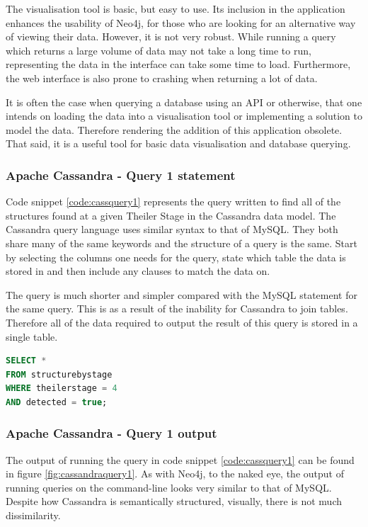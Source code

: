 The visualisation tool is basic, but easy to use. Its inclusion in the application enhances the usability of Neo4j, for those who are looking for an alternative way of viewing their data. However, it is not very robust. While running a query which returns a large volume of data may not take a long time to run, representing the data in the interface can take some time to load. Furthermore, the web interface is also prone to crashing when returning a lot of data.

It is often the case when querying a database using an API or otherwise, that one intends on loading the data into a visualisation tool or implementing a solution to model the data. Therefore rendering the addition of this application obsolete. That said, it is a useful tool for basic data visualisation and database querying.

\subsubsection*{Apache Cassandra - Query 1 statement}\label{cassquery1statement}
Code snippet \ref{code:cassquery1} represents the query written to find all of the structures found at a given Theiler Stage in the Cassandra data model. The Cassandra query language uses similar syntax to that of MySQL. They both share many of the same keywords and the structure of a query is the same. Start by selecting the columns one needs for the query, state which table the data is stored in and then include any clauses to match the data on.

The query is much shorter and simpler compared with the MySQL statement for the same query. This is as a result of the inability for Cassandra to join tables. Therefore all of the data required to output the result of this query is stored in a single table.

\begin{lstlisting}[language=SQL, caption=Cassandra query 1 statement. All structures at Theiler Stage X., label=code:cassquery1]
SELECT *
FROM structurebystage
WHERE theilerstage = 4
AND detected = true;
\end{lstlisting}

\subsubsection*{Apache Cassandra - Query 1 output}\label{cassquery1output}
The output of running the query in code snippet \ref{code:cassquery1} can be found in figure \ref{fig:cassandraquery1}. As with Neo4j, to the naked eye, the output of running queries on the command-line looks very similar to that of MySQL. Despite how Cassandra is semantically structured, visually, there is not much dissimilarity.

